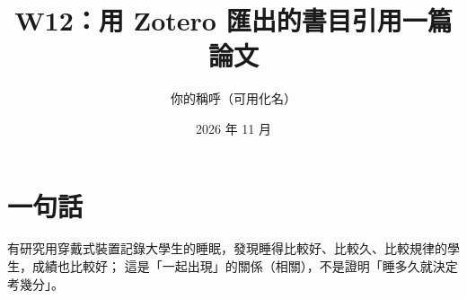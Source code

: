 \documentclass[12pt,a4paper]{article}
\title{W12：用 Zotero 匯出的書目引用一篇論文}
\author{你的稱呼（可用化名）}
\date{2026 年 11 月}
\begin{document}
\maketitle

\section{一句話}
有研究用穿戴式裝置記錄大學生的睡眠，發現睡得比較好、比較久、比較規律的學生，成績也比較好；
這是「一起出現」的關係（相關），不是證明「睡多久就決定考幾分」\cite{okano_sleep_2019}。 %


\end{document}
